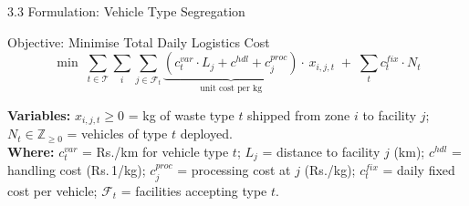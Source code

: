 \documentclass[aspectratio=169]{beamer}
\begin{document}
\begin{frame}{3.3 Formulation: Vehicle Type Segregation}
    \begin{alertblock}{Objective: Minimise Total Daily Logistics Cost}
        $$ \min \; \sum_{t \in \mathcal{T}} \sum_{i} \sum_{j \in \mathcal{F}_t} \underbrace{\left(c^{var}_t \cdot L_j + c^{hdl} + c^{proc}_j\right)}_{\text{unit cost per kg}} \!\cdot\, x_{i,j,t} \;+\; \sum_{t} c^{fix}_t \cdot N_t $$
    \end{alertblock}

    \footnotesize
    \textbf{Variables:} $x_{i,j,t} \ge 0$ = kg of waste type $t$ shipped from zone $i$ to facility $j$; \;\; $N_t \in \mathbb{Z}_{\ge 0}$ = vehicles of type $t$ deployed. \\
    \textbf{Where:} $c^{var}_t$ = Rs./km for vehicle type $t$; \; $L_j$ = distance to facility $j$ (km); \; $c^{hdl}$ = handling cost (Rs.\,1/kg); \; $c^{proc}_j$ = processing cost at $j$ (Rs./kg); \; $c^{fix}_t$ = daily fixed cost per vehicle; \; $\mathcal{F}_t$ = facilities accepting type $t$.


\end{frame}
\end{document}
